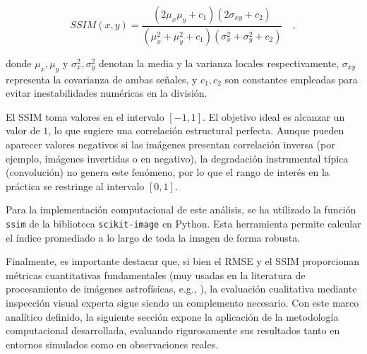 \begin{equation}
    \label{eq:SSIM}
    SSIM(x, y) = \frac{(2\mu_x\mu_y + c_1)(2\sigma_{xy} + c_2)}{(\mu_x^2 + \mu_y^2 + c_1)(\sigma_x^2 + \sigma_y^2 + c_2)} \quad,
\end{equation}

donde $\mu_x, \mu_y$ y $\sigma_x^2, \sigma_y^2$ denotan la media y la varianza locales respectivamente, $\sigma_{xy}$ representa la covarianza de ambas señales, y $c_1, c_2$ son constantes empleadas para evitar inestabilidades numéricas en la división.

El SSIM toma valores en el intervalo $[-1, 1]$. El objetivo ideal es alcanzar un valor de $1$, lo que sugiere una correlación estructural perfecta. Aunque pueden aparecer valores negativos si las imágenes presentan correlación inversa (por ejemplo, imágenes invertidas o en negativo), la degradación instrumental típica (convolución) no genera este fenómeno, por lo que el rango de interés en la práctica se restringe al intervalo $[0, 1]$.

Para la implementación computacional de este análisis, se ha utilizado la función \texttt{ssim} de la biblioteca \texttt{scikit-image} en Python. Esta herramienta permite calcular el índice promediado a lo largo de toda la imagen de forma robusta.

Finalmente, es importante destacar que, si bien el RMSE y el SSIM proporcionan métricas cuantitativas fundamentales (muy usadas en la literatura de procesamiento de imágenes astrofísicas, e.g., \cite{alnajjarComparativeAnalysisImage2024}), la evaluación cualitativa mediante inspección visual experta sigue siendo un complemento necesario. Con este marco analítico definido, la siguiente sección expone la aplicación de la metodología computacional desarrollada, evaluando rigurosamente sus resultados tanto en entornos simulados como en observaciones reales.